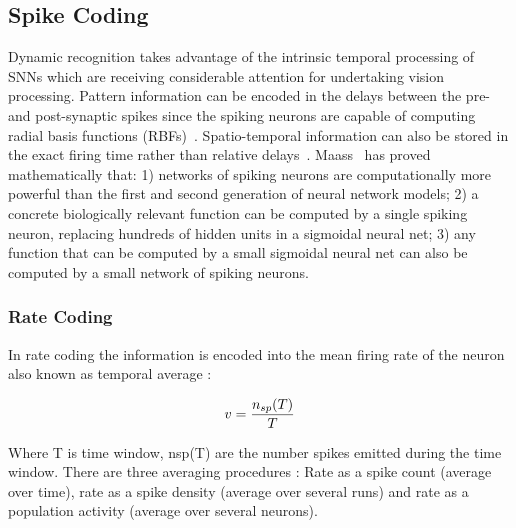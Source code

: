 \subsection{Spike Coding}
Dynamic recognition takes advantage of the intrinsic temporal processing of SNNs which are receiving considerable attention for  undertaking vision processing.
Pattern information can be encoded in the delays between the pre- and post-synaptic spikes since the spiking neurons are capable of computing radial basis functions (RBFs)~\cite{hopfield1995pattern}.
Spatio-temporal information can also be stored in the exact firing time rather than relative delays~\cite{natschlager1998spatial}.
Maass~\cite{maass1997networks} has proved mathematically that:
1) networks of spiking neurons are computationally more powerful than the first and second generation of neural network models;
2) a concrete biologically relevant function can be computed by a single spiking neuron, replacing  hundreds of hidden units in a sigmoidal neural net;
3) any function that can be computed by a small sigmoidal neural net can also be computed by a small network of spiking neurons.
\subsubsection{Rate Coding}

In rate coding the information is encoded into the mean firing rate of the neuron also known as temporal average \cite{gernstbook}:

\begin{equation} \label{eq:lif2}
v = {{n_{sp}(T)} \over T}
\end{equation}

Where T is time window, nsp(T) are the number spikes emitted during the time window. There are three averaging procedures \cite{gernstbook}: Rate as a spike count (average over time), rate as a spike density (average over several runs) and rate as a population activity (average over several neurons).

